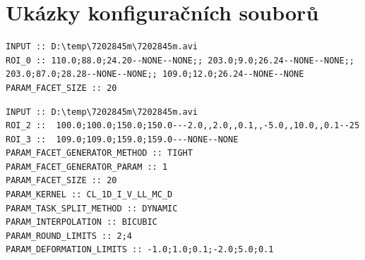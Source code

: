 \documentclass[a4paper,12pt]{article}
\begin{document}
\section{Ukázky konfiguračních souborů}
\begin{lstlisting}[title=Jednoduchý konfigurační soubor pro automatický výpočet]
INPUT :: D:\temp\7202845m\7202845m.avi
ROI_0 :: 110.0;88.0;24.20--NONE--NONE;; 203.0;9.0;26.24--NONE--NONE;; 203.0;87.0;28.28--NONE--NONE;; 109.0;12.0;26.24--NONE--NONE
PARAM_FACET_SIZE :: 20
\end{lstlisting}
\begin{lstlisting}[title=Plný konfigurační soubor pro automatický výpočet]
INPUT :: D:\temp\7202845m\7202845m.avi
ROI_2 ::  100.0;100.0;150.0;150.0---2.0,,2.0,,0.1,,-5.0,,10.0,,0.1--25
ROI_3 ::  109.0;109.0;159.0;159.0---NONE--NONE
PARAM_FACET_GENERATOR_METHOD :: TIGHT
PARAM_FACET_GENERATOR_PARAM :: 1
PARAM_FACET_SIZE :: 20
PARAM_KERNEL :: CL_1D_I_V_LL_MC_D
PARAM_TASK_SPLIT_METHOD :: DYNAMIC
PARAM_INTERPOLATION :: BICUBIC
PARAM_ROUND_LIMITS :: 2;4
PARAM_DEFORMATION_LIMITS :: -1.0;1.0;0.1;-2.0;5.0;0.1
\end{lstlisting}
\end{document}
